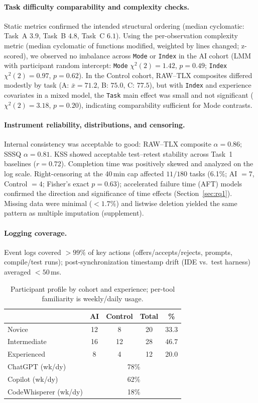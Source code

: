 \documentclass[sigconf]{acmart}
\begin{document}
\paragraph{Task difficulty comparability and complexity checks.}
Static metrics confirmed the intended structural ordering (median cyclomatic: Task~A $3.9$, Task~B $4.8$, Task~C $6.1$). Using the per-observation complexity metric (median cyclomatic of functions modified, weighted by lines changed; z-scored), we observed no imbalance across \texttt{Mode} or \texttt{Index} in the AI cohort (LMM with participant random intercept: \texttt{Mode} $\chi^2(2){=}1.42$, $p{=}0.49$; \texttt{Index} $\chi^2(2){=}0.97$, $p{=}0.62$). In the Control cohort, RAW--TLX composites differed modestly by task (A: $\bar{x}{=}71.2$, B: $75.0$, C: $77.5$), but with \texttt{Index} and experience covariates in a mixed model, the \texttt{Task} main effect was small and not significant ($\chi^2(2){=}3.18$, $p{=}0.20$), indicating comparability sufficient for Mode contrasts.
\paragraph{Instrument reliability, distributions, and censoring.}
Internal consistency was acceptable to good: RAW--TLX composite $\alpha{=}0.86$; SSSQ $\alpha{=}0.81$. KSS showed acceptable test--retest stability across Task~1 baselines ($r{=}0.72$). Completion time was positively skewed and analyzed on the log scale. Right-censoring at the 40\,min cap affected $11/180$ tasks (6.1\%; AI $=7$, Control $=4$; Fisher’s exact $p{=}0.63$); accelerated failure time (AFT) models confirmed the direction and significance of time effects (Section~\ref{sec:rq1}). Missing data were minimal ($<1.7\%$) and listwise deletion yielded the same pattern as multiple imputation (supplement).
\paragraph{Logging coverage.}
Event logs covered $>\!99\%$ of key actions (offers/accepts/rejects, prompts, compile/test runs); post\hyp{}synchronization timestamp drift (IDE vs.\ test harness) averaged $<50$\,ms.

\begin{table}[t]
  \centering
  \caption{Participant profile by cohort and experience; per-tool familiarity is weekly/daily usage.}
  \label{tab:profile}
  \small
  \begin{tabular}{lcccc}
    \toprule
    & \textbf{AI} & \textbf{Control} & \textbf{Total} & \textbf{\%} \\
    \midrule
    Novice & 12 & 8 & 20 & 33.3 \\
    Intermediate & 16 & 12 & 28 & 46.7 \\
    Experienced & 8 & 4 & 12 & 20.0 \\
    \midrule
    ChatGPT (wk/dy) & \multicolumn{4}{c}{78\%} \\
    Copilot (wk/dy) & \multicolumn{4}{c}{62\%} \\
    CodeWhisperer (wk/dy) & \multicolumn{4}{c}{18\%} \\
    \bottomrule
  \end{tabular}
\end{table}
\end{document}
